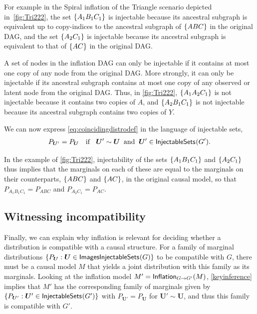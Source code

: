 \documentclass[aps,english,10pt,superscriptaddress,onecolumn,twoside,longbibliography,pra,floatfix,fleqn,nofootinbib]{revtex4-1}%
\theoremstyle{definition}
\newcounter{example}[section]
\newcommand{\SmallNamedFunction}[3][]{\operatorname{\mathsf{#2}}_{#1}\parenths{#3}}
\DeclarePairedDelimiter{\parenths}{\lparen}{\rparen}
\DeclarePairedDelimiter{\braces}{\lbrace}{\rbrace}
\newcommand{\brackets}[1]{\braces*{#1}}
\begin{document}
For example in the Spiral inflation of the Triangle scenario depicted in~\cref{fig:Tri222}, the set $\brackets{A_1 B_1 C_1}$ is injectable because its ancestral subgraph is equivalent up to copy-indices to the ancestral subgraph of $\brackets{A B C}$ in the original DAG, and the set $\brackets{A_2 C_1}$ is injectable because its ancestral subgraph is equivalent to that of $\brackets{ A C}$ in the original DAG.

A set of nodes in the inflation DAG can only be injectable if it contains at most one copy of any node from the original DAG. More strongly, it can only be injectable if its ancestral subgraph contains at most one copy of any observed or latent node from the original DAG.  
Thus, in \cref{fig:Tri222}, $\brackets{A_1 A_2 C_1}$ is not injectable because it contains two copies of $A$, and $\brackets{A_2 B_1 C_1}$ is not injectable because its ancestral subgraph contains two copies of $Y$. 

We can now express \cref{eq:coincidingdistrodef} in the language of injectable sets,
\begin{align}\label{keyinference}
P_{\bm{U}'}=P_{\bm{U}}\quad\text{if }  \;\; \bm{U}' \sim \bm{U}\;\; \text{and} \;\; \bm{U}'\in\SmallNamedFunction{InjectableSets}{G'}.
\end{align}

In the example of \cref{fig:Tri222}, injectability of the sets $\brackets{A_1 B_1 C_1}$ and $\brackets{A_2 C_1}$ thus implies that the marginals on each of these are equal to the marginals on their counterparts, $\brackets{A B C}$ and $\brackets{A C}$, in the original causal model, so that $P_{A_1 B_1 C_1} = P_{A B C}$ and $P_{A_2 C_1} = P_{A C}$.

\subsection{Witnessing incompatibility}
\label{subsec:witnessingincompat}

Finally, we can explain why inflation is relevant for deciding whether a distribution is compatible with a causal structure.  For a family of marginal distributions $\{ P_{\bm{U}} : \bm{U} \in \SmallNamedFunction{ImagesInjectableSets}{G}\}$ to be compatible with $G$, there must be a causal model $M$ that yields a joint distribution with this family as its marginals. Looking at the inflation model $M' = \SmallNamedFunction[G\to G']{Inflation}{M}$, \cref{keyinference} implies that $M'$ has the corresponding family of marginals given by $\{ P_{\bm{U}'} : \bm{U}' \in \SmallNamedFunction{InjectableSets}{G'}\}$ with $P_{\bm{U}'} = P_{\bm{U}}$ for $\bm{U}'\sim\bm{U}$, and thus this family is compatible with $G'$.
\end{document}
